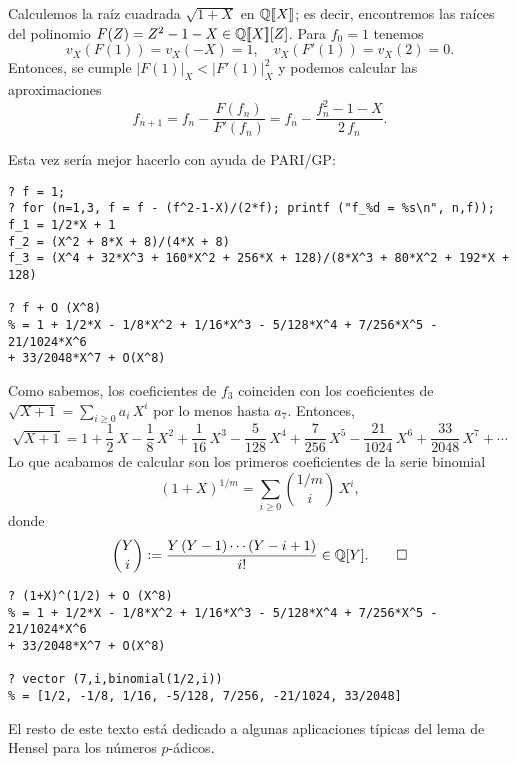 \documentclass{article}
\numberwithin{equation}{section}
\theoremstyle{definition}
\begin{document}
\begin{ejemplo}
  \label{ejemplo:raiz-cuadrada-de-1+X}
  Calculemos la raíz cuadrada $\sqrt{1+X}$ en $\mathbb{Q} [\![X]\!]$; es decir,
  encontremos las raíces del polinomio
  $F (Z) = Z^2 - 1 - X \in \mathbb{Q} [\![X]\!] [Z]$. Para $f_0 = 1$ tenemos
  $$v_X (F (1)) = v_X (-X) = 1, \quad v_X (F' (1)) = v_X (2) = 0.$$
  Entonces, se cumple $|F (1)|_X < |F' (1)|_X^2$ y podemos calcular las
  aproximaciones
  $$f_{n+1} = f_n - \frac{F (f_n)}{F' (f_n)} = f_n - \frac{f_n^2 - 1 - X}{2\,f_n}.$$

  \pagebreak

  Esta vez sería mejor hacerlo con ayuda de PARI/GP:

  \begin{framed}\small
\begin{verbatim}
? f = 1;
? for (n=1,3, f = f - (f^2-1-X)/(2*f); printf ("f_%d = %s\n", n,f));
f_1 = 1/2*X + 1
f_2 = (X^2 + 8*X + 8)/(4*X + 8)
f_3 = (X^4 + 32*X^3 + 160*X^2 + 256*X + 128)/(8*X^3 + 80*X^2 + 192*X + 128)

? f + O (X^8)
% = 1 + 1/2*X - 1/8*X^2 + 1/16*X^3 - 5/128*X^4 + 7/256*X^5 - 21/1024*X^6
+ 33/2048*X^7 + O(X^8)
\end{verbatim}
  \end{framed}

  Como sabemos, los coeficientes de $f_3$ coinciden con los coeficientes de
  $\sqrt{X+1} = \sum_{i \ge 0} a_i\,X^i$ por lo menos hasta $a_7$. Entonces,
  \[ \sqrt{X+1} = 1 + \frac{1}{2}\,X - \frac{1}{8}\,X^2 + \frac{1}{16}\,X^3 -
                  \frac{5}{128}\,X^4 + \frac{7}{256}\,X^5 - \frac{21}{1024}\,X^6 +
                  \frac{33}{2048}\,X^7 + \cdots\]
  Lo que acabamos de calcular son los primeros coeficientes de la serie
  binomial
  $$(1+X)^{1/m} = \sum_{i \ge 0} {1/m \choose i}\,X^i,$$
  donde
  \[ {Y \choose i} \mathrel{\mathop:}= \frac{Y\,(Y-1)\cdots (Y-i+1)}{i!} \in \mathbb{Q} [Y]. \qedhere \]
\end{ejemplo}

\begin{framed}\small
\begin{verbatim}
? (1+X)^(1/2) + O (X^8)
% = 1 + 1/2*X - 1/8*X^2 + 1/16*X^3 - 5/128*X^4 + 7/256*X^5 - 21/1024*X^6
+ 33/2048*X^7 + O(X^8)

? vector (7,i,binomial(1/2,i))
% = [1/2, -1/8, 1/16, -5/128, 7/256, -21/1024, 33/2048]
\end{verbatim}
\end{framed}

El resto de este texto está dedicado a algunas aplicaciones típicas del lema de
Hensel para los números $p$-ádicos.
\end{document}
